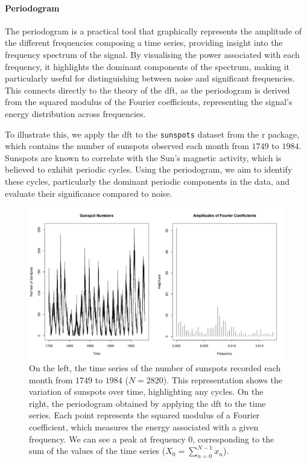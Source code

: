\begin{modified}
\paragraph{Periodogram} The periodogram is a practical tool that graphically represents the amplitude of the different frequencies composing a time series, providing insight into the frequency spectrum of the signal. By visualising the power associated with each frequency, it highlights the dominant components of the spectrum, making it particularly useful for distinguishing between noise and significant frequencies. This connects directly to the theory of the \gls{dft}, as the periodogram is derived from the squared modulus of the Fourier coefficients, representing the signal's energy distribution across frequencies.

\noindent To illustrate this, we apply the \gls{dft} to the \texttt{sunspots} dataset from the \gls{r} package, which contains the number of sunspots observed each month from $1749$ to $1984$. Sunspots are known to correlate with the Sun's magnetic activity, which is believed to exhibit periodic cycles. Using the periodogram, we aim to identify these cycles, particularly the dominant periodic components in the data, and evaluate their significance compared to noise.
\begin{figure}[ht]
	\centering
	\includegraphics[width=\textwidth]{Figures/sunspots.png}
	\caption{On the left, the time series of the number of sunspots recorded each month from $1749$ to $1984$ (\(N = 2820\)). This representation shows the variation of sunspots over time, highlighting any cycles. On the right, the periodogram obtained by applying the \gls{dft} to the time series. Each point represents the squared modulus of a Fourier coefficient, which measures the energy associated with a given frequency. We can see a peak at frequency $0$, corresponding to the sum of the values of the time series (\(X_0 = \sum_{n=0}^{N-1} x_n\)).}
\end{figure}
\end{modified}

